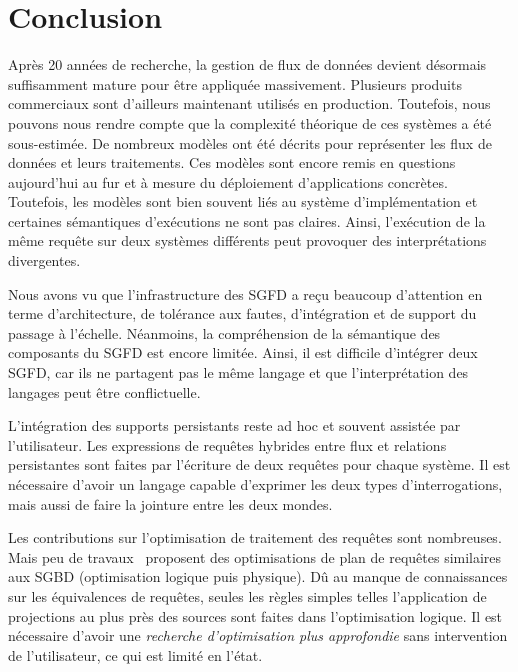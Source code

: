 \section{Conclusion}\label{sec:rw:sgfd:synthese}
Après 20 années de recherche, la gestion de flux de données devient désormais suffisamment mature pour être appliquée massivement. Plusieurs produits commerciaux sont d'ailleurs maintenant utilisés en production. Toutefois, nous pouvons nous rendre compte que la complexité théorique de ces systèmes a été sous-estimée. De nombreux modèles ont été décrits pour représenter les flux de données et leurs traitements. Ces modèles sont encore remis en questions aujourd'hui au fur et à mesure du déploiement d'applications concrètes. Toutefois, les modèles sont bien souvent liés au système d'implémentation et certaines sémantiques d'exécutions ne sont pas claires. Ainsi, l'exécution de la même requête sur deux systèmes différents peut provoquer des interprétations divergentes.

Nous avons vu que l'infrastructure des SGFD a reçu beaucoup d'attention en terme d'architecture, de tolérance aux fautes, d'intégration et de support du passage à l'échelle. Néanmoins, la compréhension de la sémantique des composants du SGFD est encore limitée. Ainsi, il est difficile d'intégrer deux SGFD, car ils ne partagent pas le même langage et que l'interprétation des langages peut être conflictuelle.

L'intégration des supports persistants reste ad hoc et souvent assistée par l'utilisateur. Les expressions de requêtes hybrides entre flux et relations persistantes sont faites par l'écriture de deux requêtes pour chaque système. Il est nécessaire d'avoir un langage capable d'exprimer les deux types d'interrogations, mais aussi de faire la jointure entre les deux mondes.

Les contributions sur l'optimisation de traitement des requêtes sont nombreuses. Mais peu de travaux~\cite{Galpin:snee,Kramer:semantics} proposent des optimisations de plan de requêtes similaires aux SGBD (optimisation logique puis physique). Dû au manque de connaissances sur les équivalences de requêtes, seules les règles simples telles l'application de projections au plus près des sources sont faites dans l'optimisation logique. Il est nécessaire d'avoir une \textit{recherche d'optimisation plus approfondie} sans intervention de l'utilisateur, ce qui est limité en l'état.
